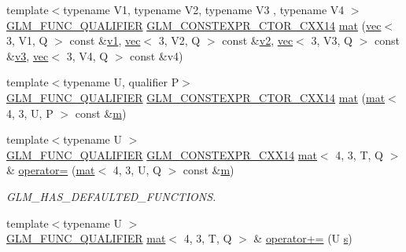 \begin{DoxyCompactItemize}
\item 
{\footnotesize template$<$typename V1, typename V2, typename V3 , typename V4 $>$ }\\\hyperlink{setup_8hpp_a33fdea6f91c5f834105f7415e2a64407}{G\+L\+M\+\_\+\+F\+U\+N\+C\+\_\+\+Q\+U\+A\+L\+I\+F\+I\+ER} \hyperlink{setup_8hpp_a0900f9145e68bf6061b6f5e7be3fa751}{G\+L\+M\+\_\+\+C\+O\+N\+S\+T\+E\+X\+P\+R\+\_\+\+C\+T\+O\+R\+\_\+\+C\+X\+X14} \hyperlink{structglm_1_1mat_3_014_00_013_00_01_t_00_01_q_01_4_a51464174c591e7c9c6feea63148a686c}{mat} (\hyperlink{structglm_1_1vec}{vec}$<$ 3, V1, Q $>$ const \&\hyperlink{_s_d_l__opengl__glext_8h_a435c176a02c061b43e19bdf7c86cceae}{v1}, \hyperlink{structglm_1_1vec}{vec}$<$ 3, V2, Q $>$ const \&\hyperlink{_s_d_l__opengl__glext_8h_a0928f6d0f0f794ba000a21dfae422136}{v2}, \hyperlink{structglm_1_1vec}{vec}$<$ 3, V3, Q $>$ const \&\hyperlink{_s_d_l__opengl__glext_8h_acc806b31cbf466ceba6555983d8b814d}{v3}, \hyperlink{structglm_1_1vec}{vec}$<$ 3, V4, Q $>$ const \&v4)
\item 
{\footnotesize template$<$typename U, qualifier P$>$ }\\\hyperlink{setup_8hpp_a33fdea6f91c5f834105f7415e2a64407}{G\+L\+M\+\_\+\+F\+U\+N\+C\+\_\+\+Q\+U\+A\+L\+I\+F\+I\+ER} \hyperlink{setup_8hpp_a0900f9145e68bf6061b6f5e7be3fa751}{G\+L\+M\+\_\+\+C\+O\+N\+S\+T\+E\+X\+P\+R\+\_\+\+C\+T\+O\+R\+\_\+\+C\+X\+X14} \hyperlink{structglm_1_1mat_3_014_00_013_00_01_t_00_01_q_01_4_a8227f64e941f2a66f0ac66efde15e224}{mat} (\hyperlink{structglm_1_1mat}{mat}$<$ 4, 3, U, P $>$ const \&\hyperlink{_s_d_l__opengl__glext_8h_af593500c283bf1a787a6f947f503a5c2}{m})
\item 
{\footnotesize template$<$typename U $>$ }\\\hyperlink{setup_8hpp_a33fdea6f91c5f834105f7415e2a64407}{G\+L\+M\+\_\+\+F\+U\+N\+C\+\_\+\+Q\+U\+A\+L\+I\+F\+I\+ER} \hyperlink{setup_8hpp_a4dd12abf5e1164bc57f3a34671d03844}{G\+L\+M\+\_\+\+C\+O\+N\+S\+T\+E\+X\+P\+R\+\_\+\+C\+X\+X14} \hyperlink{structglm_1_1mat}{mat}$<$ 4, 3, T, Q $>$ \& \hyperlink{structglm_1_1mat_3_014_00_013_00_01_t_00_01_q_01_4_aa924cf798f7324b172ca31f969fd02e4}{operator=} (\hyperlink{structglm_1_1mat}{mat}$<$ 4, 3, U, Q $>$ const \&\hyperlink{_s_d_l__opengl__glext_8h_af593500c283bf1a787a6f947f503a5c2}{m})
\begin{DoxyCompactList}\small\item\em G\+L\+M\+\_\+\+H\+A\+S\+\_\+\+D\+E\+F\+A\+U\+L\+T\+E\+D\+\_\+\+F\+U\+N\+C\+T\+I\+O\+NS. \end{DoxyCompactList}\item 
{\footnotesize template$<$typename U $>$ }\\\hyperlink{setup_8hpp_a33fdea6f91c5f834105f7415e2a64407}{G\+L\+M\+\_\+\+F\+U\+N\+C\+\_\+\+Q\+U\+A\+L\+I\+F\+I\+ER} \hyperlink{structglm_1_1mat}{mat}$<$ 4, 3, T, Q $>$ \& \hyperlink{structglm_1_1mat_3_014_00_013_00_01_t_00_01_q_01_4_ab093ab8d6e82815249f24bb79439fae2}{operator+=} (U \hyperlink{_s_d_l__opengl_8h_a4af680a6c683f88ed67b76f207f2e6e4}{s})

\end{DoxyCompactItemize}
